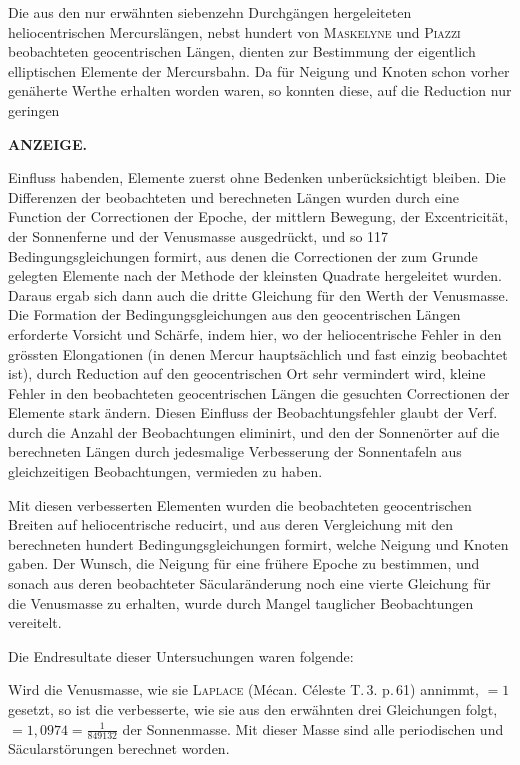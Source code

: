 Die aus den nur erwähnten siebenzehn Durchgängen hergeleiteten heliocentrischen Mercurslängen, nebst hundert von \textsc{Maskelyne} und \textsc{Piazzi} beobachteten geocentrischen Längen, dienten zur Bestimmung der eigentlich elliptischen Elemente der Mercursbahn. Da für Neigung und Knoten schon vorher genäherte Werthe erhalten worden waren, so konnten diese, auf die Reduction nur geringen\par
\clearpage
\thispagestyle{empty}
\noindent{}%
%
\parbox[t]{\dimexpr\linewidth-24mm\relax}{\centering\footnotesize\bfseries ANZEIGE.\par}%
\makebox[12mm][r]{}\par\nobreak\medskip
\noindent Einfluss habenden, Elemente zuerst ohne Bedenken unberücksichtigt bleiben. Die Differenzen der beobachteten und berechneten Längen wurden durch eine Function der Correctionen der Epoche, der mittlern Bewegung, der Excentricität, der Sonnenferne und der Venusmasse ausgedrückt, und so 117 Bedingungsgleichungen formirt, aus denen die Correctionen der zum Grunde gelegten Elemente nach der Methode der kleinsten Quadrate hergeleitet wurden. Daraus ergab sich dann auch die dritte Gleichung für den Werth der Venusmasse. Die Formation der Bedingungsgleichungen aus den geocentrischen Längen erforderte Vorsicht und Schärfe, indem hier, wo der heliocentrische Fehler in den grössten Elongationen (in denen Mercur hauptsächlich und fast einzig beobachtet ist), durch Reduction auf den geocentrischen Ort sehr vermindert wird, kleine Fehler in den beobachteten geocentrischen Längen die gesuchten Correctionen der Elemente stark ändern. Diesen Einfluss der Beobachtungsfehler glaubt der Verf. durch die Anzahl der Beobachtungen eliminirt, und den der Sonnenörter auf die berechneten Längen durch jedesmalige Verbesserung der Sonnentafeln aus gleichzeitigen Beobachtungen, vermieden zu haben.

Mit diesen verbesserten Elementen wurden die beobachteten geocentrischen Breiten auf heliocentrische reducirt, und aus deren Vergleichung mit den berechneten hundert Bedingungsgleichungen formirt, welche Neigung und Knoten gaben. Der Wunsch, die Neigung für eine frühere Epoche zu bestimmen, und sonach aus deren beobachteter Säcularänderung noch eine vierte Gleichung für die Venusmasse zu erhalten, wurde durch Mangel tauglicher Beobachtungen vereitelt.

Die Endresultate dieser Untersuchungen waren folgende:

Wird die Venusmasse, wie sie \textsc{Laplace} (Mécan. Céleste T.\,3. p.\,61) annimmt, $= 1$ gesetzt, so ist die verbesserte, wie sie aus den erwähnten drei Gleichungen folgt, $= 1{,}0974 = \frac{1}{849132}$ der Sonnenmasse. Mit dieser Masse sind alle periodischen und Säcularstörungen berechnet worden.

